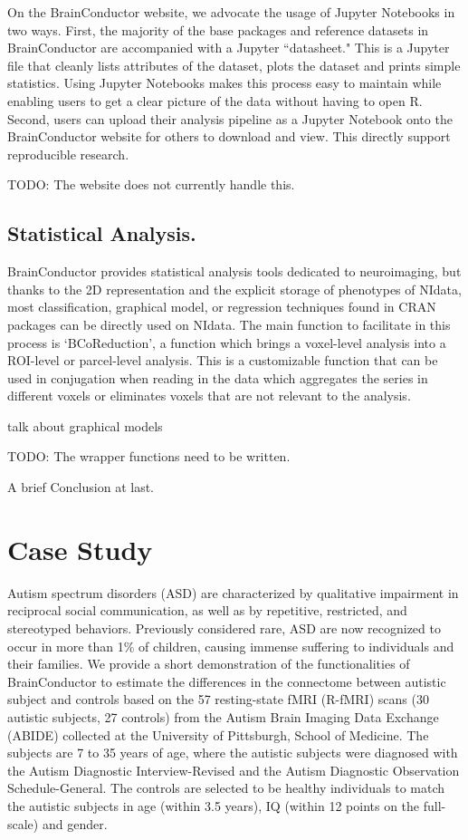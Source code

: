 \documentclass{nature}
\begin{document}
On the BrainConductor website, we advocate the usage of Jupyter Notebooks
in two ways. First, the majority of the base packages and reference datasets
in BrainConductor are accompanied with a Jupyter ``datasheet." This is a
Jupyter file that cleanly lists attributes of the dataset, plots the dataset
and prints simple statistics. Using Jupyter Notebooks makes this process easy
to maintain while enabling users to get a clear picture of the data without
having to open R. Second, users can upload their analysis pipeline as a Jupyter
Notebook onto the BrainConductor website for others to download and view. This
directly support reproducible research.

{\color{red}TODO: The website does not currently handle this.}

\subsection{Statistical Analysis.}

BrainConductor provides statistical analysis tools dedicated to neuroimaging,
but thanks to the 2D representation and the explicit storage of
phenotypes of NIdata, most classification, graphical model, or regression
techniques
found in CRAN packages can be directly used on NIdata. The main function to
facilitate in this process is `BCoReduction', a function which brings a
voxel-level
analysis into a ROI-level or parcel-level analysis. This is a customizable
function
that can be used in conjugation when reading in the data which aggregates
the series
in different voxels or eliminates voxels that are not relevant to the analysis.

{\color{red}talk about graphical models}

{\color{red}TODO: The wrapper functions need to be written.}

A brief Conclusion at last.

\section{Case Study}

Autism spectrum disorders (ASD) are characterized by qualitative impairment in reciprocal social communication, as well as by repetitive, restricted, and stereotyped behaviors. Previously considered rare, ASD are now recognized to occur in more than 1\% of children, causing immense suffering to individuals and their families. 
We provide a short demonstration of the functionalities of BrainConductor to
estimate the differences in the connectome between autistic subject and controls based
on the 57 resting-state fMRI (R-fMRI) scans (30 autistic subjects, 27 controls) from the Autism
Brain Imaging Data Exchange (ABIDE) collected at the 
University of Pittsburgh, School of Medicine\cite{di2014autism}. 
The subjects are 7 to 35 years of age, where the autistic subjects were
diagnosed with the Autism Diagnostic Interview-Revised and the Autism Diagnostic 
Observation Schedule-General. The controls are selected to be healthy
individuals to match the autistic subjects in age (within 3.5 years), IQ (within
12 points on the full-scale) and gender.
\end{document}
